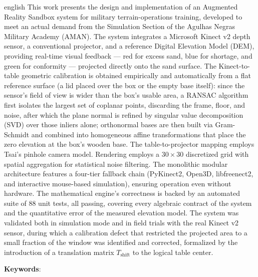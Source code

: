 \begin{resumo}[Abstract]
\begin{otherlanguage*}{english}
\SingleSpacing
This work presents the design and implementation of an Augmented Reality Sandbox system for military terrain-operations training, developed to meet an actual demand from the Simulation Section of the Agulhas Negras Military Academy (AMAN). The system integrates a Microsoft Kinect v2 depth sensor, a conventional projector, and a reference Digital Elevation Model (DEM), providing real-time visual feedback --- red for excess sand, blue for shortage, and green for conformity --- projected directly onto the sand surface. The Kinect-to-table geometric calibration is obtained empirically and automatically from a flat reference surface (a lid placed over the box or the empty base itself): since the sensor's field of view is wider than the box's usable area, a RANSAC algorithm first isolates the largest set of coplanar points, discarding the frame, floor, and noise, after which the plane normal is refined by singular value decomposition (SVD) over those inliers alone; orthonormal bases are then built via Gram-Schmidt and combined into homogeneous affine transformations that place the zero elevation at the box's wooden base. The table-to-projector mapping employs Tsai's pinhole camera model. Rendering employs a $30 \times 30$ discretized grid with spatial aggregation for statistical noise filtering. The monolithic modular architecture features a four-tier fallback chain (PyKinect2, Open3D, libfreenect2, and interactive mouse-based simulation), ensuring operation even without hardware. The mathematical engine's correctness is backed by an automated suite of 88 unit tests, all passing, covering every algebraic contract of the system and the quantitative error of the measured elevation model. The system was validated both in simulation mode and in field trials with the real Kinect v2 sensor, during which a calibration defect that restricted the projected area to a small fraction of the window was identified and corrected, formalized by the introduction of a translation matrix $T_{\text{shift}}$ to the logical table center.

\vspace{\onelineskip}
\noindent\textbf{Keywords}: \imprimirkeywords
\end{otherlanguage*}
\end{resumo}
